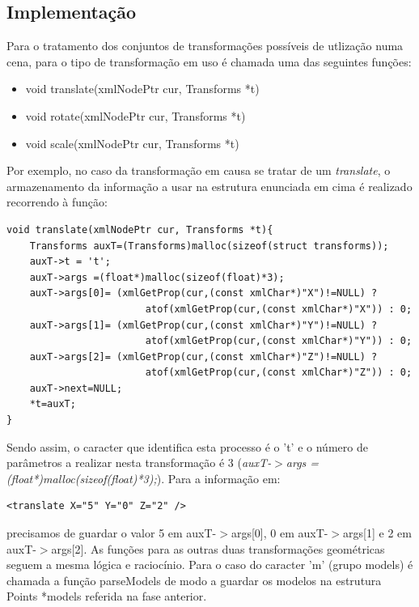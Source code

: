 \documentclass{article}
\begin{document}
\subsection{Implementação}
Para o tratamento dos conjuntos de transformações possíveis de utlização numa cena, para o tipo de transformação em uso é chamada uma das seguintes funções:
\begin{itemize}
    \item void translate(xmlNodePtr cur, Transforms *t)
    \item void rotate(xmlNodePtr cur, Transforms *t)
    \item void scale(xmlNodePtr cur, Transforms *t)
\end{itemize}
Por exemplo, no caso da transformação em causa se tratar de um \textit{translate}, o armazenamento da informação a usar na estrutura enunciada em cima é realizado recorrendo à função:
\begin{verbatim}
void translate(xmlNodePtr cur, Transforms *t){
    Transforms auxT=(Transforms)malloc(sizeof(struct transforms));
    auxT->t = 't';
    auxT->args =(float*)malloc(sizeof(float)*3);
    auxT->args[0]= (xmlGetProp(cur,(const xmlChar*)"X")!=NULL) ? 
                        atof(xmlGetProp(cur,(const xmlChar*)"X")) : 0;
    auxT->args[1]= (xmlGetProp(cur,(const xmlChar*)"Y")!=NULL) ? 
                        atof(xmlGetProp(cur,(const xmlChar*)"Y")) : 0;
    auxT->args[2]= (xmlGetProp(cur,(const xmlChar*)"Z")!=NULL) ? 
                        atof(xmlGetProp(cur,(const xmlChar*)"Z")) : 0;
    auxT->next=NULL;
    *t=auxT;
}
\end{verbatim}
Sendo assim, o caracter que identifica esta processo é o 't' e o número de parâmetros a realizar nesta transformação é 3 (\textit{auxT-$>$args =(float*)malloc(sizeof(float)*3);}).
\newline
Para a informação em:
\begin{verbatim}
<translate X="5" Y="0" Z="2" />
\end{verbatim}
precisamos de guardar o valor 5 em auxT-$>$args[0], 0 em auxT-$>$args[1] e 2 em auxT-$>$args[2].
\newline
As funções para as outras duas transformações geométricas seguem a mesma lógica e raciocínio.
Para o caso do caracter 'm' (grupo models) é chamada a função parseModels de modo a guardar os modelos na estrutura Points *models referida na fase anterior.
\end{document}
